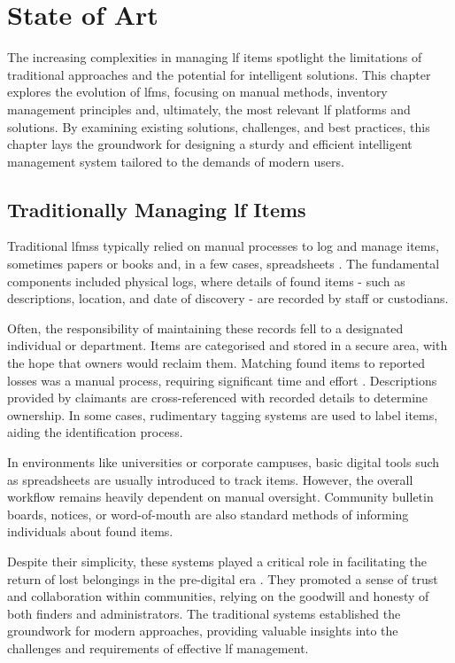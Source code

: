 \chapter{State of Art} \label{chapter:state_of_art}

The increasing complexities in managing \ac{lf} items spotlight the limitations of traditional approaches and the potential for intelligent solutions. This chapter explores the evolution of \ac{lfms}, focusing on manual methods, inventory management principles and, ultimately, the most relevant \ac{lf} platforms and solutions. By examining existing solutions, challenges, and best practices, this chapter lays the groundwork for designing a sturdy and efficient intelligent management system tailored to the demands of modern users.


\section{Traditionally Managing \acl{lf} Items} \label{sec:manually-managing-lf-items}

Traditional \acp{lfms} typically relied on manual processes to log and manage items, sometimes papers or books and, in a few cases, spreadsheets \cite{Anas2023}. The fundamental components included physical logs, where details of found items - such as descriptions, location, and date of discovery - are recorded by staff or custodians.

Often, the responsibility of maintaining these records fell to a designated individual or department. Items are categorised and stored in a secure area, with the hope that owners would reclaim them. Matching found items to reported losses was a manual process, requiring significant time and effort \cite{Anas2023}. Descriptions provided by claimants are cross-referenced with recorded details to determine ownership. In some cases, rudimentary tagging systems are used to label items, aiding the identification process.

In environments like universities or corporate campuses, basic digital tools such as spreadsheets are usually introduced to track items. However, the overall workflow remains heavily dependent on manual oversight. Community bulletin boards, notices, or word-of-mouth are also standard methods of informing individuals about found items.

Despite their simplicity, these systems played a critical role in facilitating the return of lost belongings in the pre-digital era \cite{Mayura2024}. They promoted a sense of trust and collaboration within communities, relying on the goodwill and honesty of both finders and administrators. The traditional systems established the groundwork for modern approaches, providing valuable insights into the challenges and requirements of effective \ac{lf} management.

